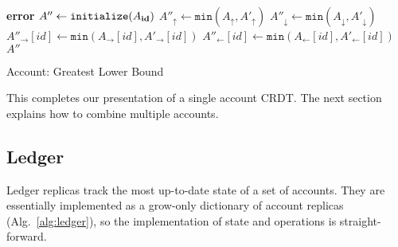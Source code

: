 \documentclass[9pt, oneside]{article}   	%
\begin{document}
\begin{algorithm}
\begin{algorithmic}[1]
     
		\textbf{error}
	\EndIf
	\State
        \State $A'' \leftarrow \texttt{initialize}(A_{\footnotesize \textbf{id}})$
        \State $A''_\uparrow \leftarrow \texttt{min}(A_\uparrow, A'_\uparrow)$
        \State $A''_\downarrow \leftarrow \texttt{min}(A_\downarrow, A'_\downarrow)$ 
	 
		\State $A''_{\rightarrow}[id] \leftarrow \texttt{min}(A_{\rightarrow}[id], A'_{\rightarrow}[id])$
	\EndFor
	 
		\State $A''_{\leftarrow}[id] \leftarrow \texttt{min}(A_{\leftarrow}[id], A'_{\leftarrow}[id])$
	\EndFor
	\State \Return $A''$	
    \EndFunction
\end{algorithmic}
\caption{\label{alg:account-hlb} Account: Greatest Lower Bound}
\end{algorithm}

This completes our presentation of a single account CRDT. The next section explains how to combine multiple accounts.



\subsection{Ledger}
\label{sec:ledger}

Ledger replicas track the most up-to-date state of a set of accounts. They are essentially implemented as a grow-only dictionary of account replicas (Alg.~\ref{alg:ledger}), so the implementation of state and operations is straight-forward.
\end{document}
